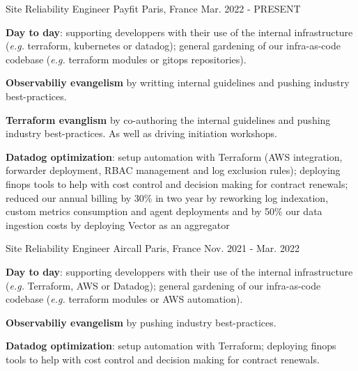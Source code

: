 

\begin{cventries}

  \cventry
    {Site Reliability Engineer} %
    {Payfit} %
    {Paris, France} %
    {Mar. 2022 - PRESENT} %
    {
      \begin{cvitems} %
        \item {\textbf{Day to day}: supporting developpers with their use of the internal infrastructure (\emph{e.g.} terraform, kubernetes or datadog); general gardening of our infra-as-code codebase (\emph{e.g.} terraform modules or gitops repositories).}
        \item {\textbf{Observabiliy evangelism} by writting internal guidelines and pushing industry best-practices.}
        \item {\textbf{Terraform evanglism} by co-authoring the internal guidelines and pushing industry best-practices. As well as driving initiation workshops.}
        \item {\textbf{Datadog optimization}: setup automation with Terraform (AWS integration, forwarder deployment, RBAC management and log exclusion rules); deploying finops tools to help with cost control and decision making for contract renewals; reduced our annual billing by 30\% in two year by reworking log indexation, custom metrics consumption and agent deployments and by 50\% our data ingestion costs by deploying Vector as an aggregator }
      \end{cvitems}
    }

  \cventry
    {Site Reliability Engineer} %
    {Aircall} %
    {Paris, France} %
    {Nov. 2021 - Mar. 2022} %
    {
      \begin{cvitems} %
        \item {\textbf{Day to day}: supporting developpers with their use of the internal infrastructure (\emph{e.g.} Terraform, AWS or Datadog); general gardening of our infra-as-code codebase (\emph{e.g.} terraform modules or AWS automation).}
        \item {\textbf{Observabiliy evangelism} by pushing industry best-practices.}
        \item {\textbf{Datadog optimization}: setup automation with Terraform; deploying finops tools to help with cost control and decision making for contract renewals.}
      \end{cvitems}
    }


\end{cventries}
